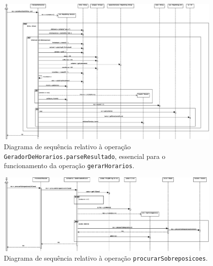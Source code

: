 \documentclass[12pt, a4paper]{article}
\begin{document}
\begingroup
    \begin{landscape}
        \thispagestyle{empty}
        \vspace*{\fill}

        \begin{figure}[H]
            \centering
            \includegraphics[scale=0.50]{Imagens/Modelos/gerarHorariosParseResultado.svg.eps}
            \caption{
                Diagrama de sequência relativo à operação \texttt{GeradorDeHorarios.parseResultado},
                essencial para o funcionamento da operação \texttt{gerarHorarios}.
            }
        \end{figure}

        \vspace*{\fill}
        \pagebreak
        \vspace*{\fill}

        \begin{figure}[H]
            \centering
            \includegraphics[scale=0.60]{Imagens/Modelos/procurarSobreposicoes.svg.eps}
            \caption{
                Diagrama de sequência relativo à operação \texttt{procurarSobreposicoes}.
            }
        \end{figure}


\end{landscape}
\end{document}
